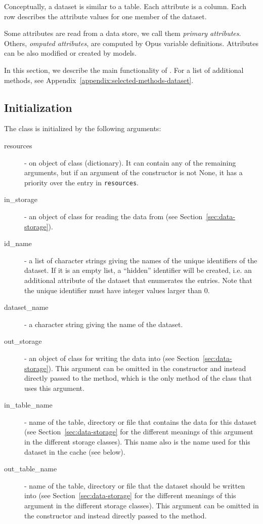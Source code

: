 Conceptually, a dataset is similar to a table.  Each attribute is a column.
Each row describes the attribute values for one member of the dataset.

Some attributes are read from a data store, we call them 
\emph{primary attributes}.
Others, \emph{omputed attributes},
are computed by Opus variable definitions.  Attributes can be also modified or created by models.

In this section, we describe the main functionality of . For a list of additional methods, 
see Appendix~\ref{appendix:selected-methods-dataset}.

%
\subsection{Initialization}
%
The  class is initialized by the following arguments:
\begin{description}
\item[resources]  - on object of class  (dictionary). It can
  contain any of the remaining arguments, but if an argument of the
  constructor is not None, it has a priority over the entry in
  \verb|resources|.
\item[in_storage]  - an object of class  for reading the data
  from (see Section~\ref{sec:data-storage}).
\item[id_name]  - a list of character strings giving the names of the unique
  identifiers of the dataset. If it is an empty list, a ``hidden'' identifier
  will be created, i.e. an additional attribute of the dataset that enumerates the entries. Note that the unique identifier 
  must have integer values larger than 0.
\item[dataset_name]  - a character string giving the name of the dataset. 
\item[out_storage]  - an object of class  for writing the data
  into (see Section~\ref{sec:data-storage}). This argument can be omitted in
  the constructor and instead directly passed to the
   method, which is the only method of the class that uses this argument.
\item[in_table_name]  - name of the table, directory or file that contains the
  data for this dataset (see Section~\ref{sec:data-storage} for the different
  meanings of this argument in the different storage classes).  This name also is the
  name used for this dataset in the cache (see below).
\item[out_table_name]  - name of the table, directory or file that the dataset 
  should be written into (see Section~\ref{sec:data-storage} for the different
  meanings of this argument in the different storage classes). This argument
  can be omitted in the constructor and instead directly passed to the
   method.
\end{description}

